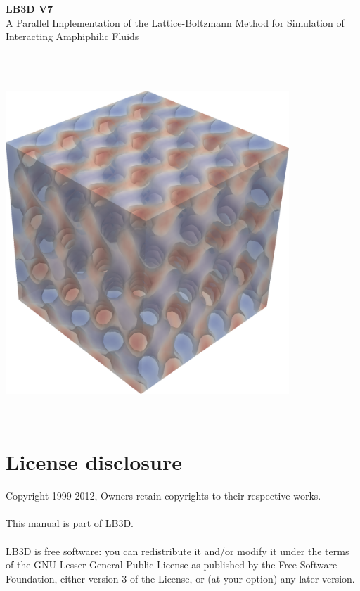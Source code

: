 \documentclass[a4paper]{article}
\begin{document}

\setlength{\parindent}{0pt}

\thispagestyle{empty}
\flushleft
{\Huge \bf \sf
LB3D V7}\\
{\Large \sf
A Parallel Implementation of the Lattice-Boltzmann Method for Simulation of Interacting Amphiphilic Fluids\\~\\}
\normalsize

{\sf \noindent \\}


\vfill
\begin{center}
\includegraphics[width=0.8\textwidth]{gyroid.png}
\end{center}
\vfill
\newpage
~
\vfill
\section*{License disclosure}
Copyright 1999-2012, Owners retain copyrights to their respective works.\\~\\

This manual is part of LB3D.\\~\\

LB3D is free software: you can redistribute it and/or modify it under the terms of the GNU Lesser General Public License as published by the Free Software Foundation, either version 3 of the License, or (at your option) any later version.
\end{document}
